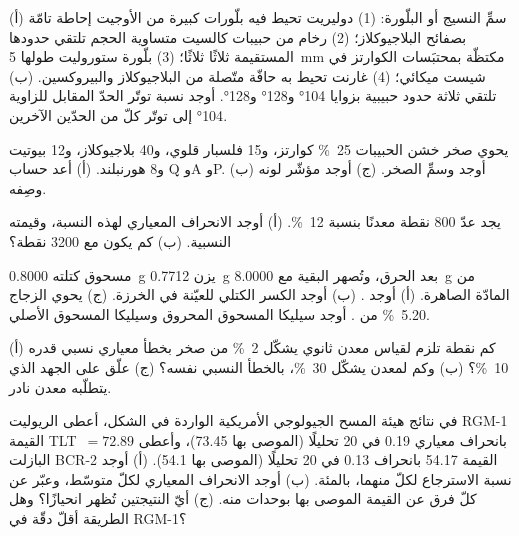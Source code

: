 \begin{exercise}[$\star$]\label{exo:b2:field-lab-methods-2:1}
(أ) سمِّ النسيج أو البلّورة: (1) دوليريت تحيط فيه بلّورات كبيرة من الأوجيت إحاطة تامّة بصفائح
البلاجيوكلاز؛ (2) رخام من حبيبات كالسيت متساوية الحجم تلتقي حدودها المستقيمة
ثلاثًا ثلاثًا؛ (3) بلّورة ستوروليت طولها \qty{5}{mm} مكتظّة بمحتبَسات الكوارتز في شيست ميكائي؛
(4) غارنت تحيط به حافّة متّصلة من البلاجيوكلاز والبيروكسين. (ب) تلتقي ثلاثة حدود حبيبية
بزوايا \ang{104} و\ang{128} و\ang{128}. أوجد نسبة توتّر الحدّ المقابل
للزاوية \ang{104} إلى توتّر كلّ من الحدّين الآخرين.
\end{exercise}

\begin{exercise}[$\star$]\label{exo:b2:field-lab-methods-2:2}
يحوي صخر خشن الحبيبات \qty{25}{\percent} كوارتز، و15 فلسبار قلوي، و40 بلاجيوكلاز، و12
بيوتيت و8 هورنبلند. (أ) أعد حساب Q وA وP. (ب) أوجد  وسمِّ الصخر. (ج) أوجد
مؤشّر لونه وصِفه.
\end{exercise}

\begin{exercise}[$\star$]\label{exo:b2:field-lab-methods-2:3}
يجد عدّ 800 نقطة معدنًا بنسبة \qty{12}{\percent}. (أ) أوجد الانحراف المعياري
لهذه النسبة، وقيمته النسبية. (ب) كم يكون مع 3200 نقطة؟
\end{exercise}

\begin{exercise}[$\star$]\label{exo:b2:field-lab-methods-2:4}
مسحوق كتلته \qty{0.8000}{g} يزن \qty{0.7712}{g} بعد الحرق، وتُصهر البقية مع
\qty{8.0000}{g} من المادّة الصاهرة. (أ) أوجد . (ب) أوجد الكسر الكتلي للعيّنة في
الخرزة. (ج) يحوي الزجاج \qty{5.20}{\percent} من . أوجد سيليكا المسحوق المحروق
وسيليكا المسحوق الأصلي.
\end{exercise}

\begin{exercise}[$\star\star$]\label{exo:b2:field-lab-methods-2:5}
(أ) كم نقطة تلزم لقياس معدن ثانوي يشكّل \qty{2}{\percent} من صخر
بخطأ معياري نسبي قدره \qty{10}{\percent}؟ (ب) وكم لمعدن يشكّل \qty{30}{\percent}،
بالخطأ النسبي نفسه؟ (ج) علّق على الجهد الذي يتطلّبه معدن نادر.
\end{exercise}

\begin{exercise}[$\star\star$]\label{exo:b2:field-lab-methods-2:6}
في نتائج هيئة المسح الجيولوجي الأمريكية الواردة في الشكل، أعطى الريوليت RGM-1 القيمة \mbox{\textdir TLT  $= 72.89$} بانحراف
معياري 0.19 في 20 تحليلًا (الموصى بها 73.45)، وأعطى البازلت BCR-2 القيمة 54.17 بانحراف 0.13 في
20 تحليلًا (الموصى بها 54.1). (أ) أوجد نسبة الاسترجاع لكلّ منهما، بالمئة. (ب) أوجد الانحراف
المعياري لكلّ متوسّط، وعبّر عن كلّ فرق عن القيمة الموصى بها بوحدات منه.
(ج) أيّ النتيجتين تُظهر انحيازًا؟ وهل الطريقة أقلّ دقّة في RGM-1؟
\end{exercise}

